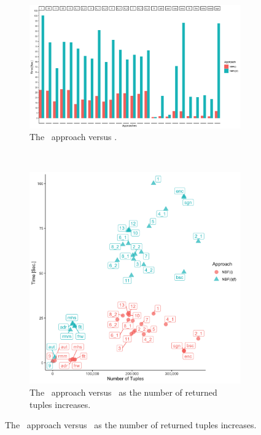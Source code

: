 \begin{figure}[t!]
    \centering
    \begin{subfigure}[t]{0.5\textwidth}
        \centering
        \includegraphics[width=\textwidth]{figs/plots/enron-nbfi-comp-f.png}
        \caption[The \nbfi\ approach versus \nbfif]{The \nbfi\ approach versus \nbfif.}
    \end{subfigure}%
    ~ 
    \begin{subfigure}[t]{0.5\textwidth}
        \centering
        \includegraphics[scale=0.09]{figs/plots/enron-nbfi-f-comp-scatter.png}
        \caption[The \nbfi\ approach versus \nbfif\ as the number of returned tuples increases]{The \nbfi\ approach versus \nbfif\ as the number of returned tuples increases.}

\end{subfigure}
\end{figure}
